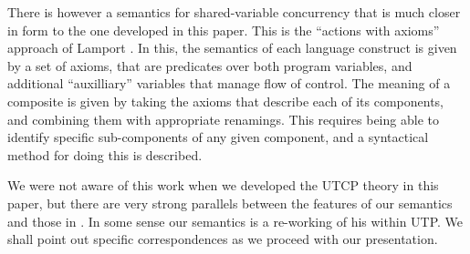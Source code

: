 There is however a semantics for shared-variable concurrency
that is much closer in form to the one developed in this paper.
This is the ``actions with axioms'' approach of Lamport \cite{Lamport1985}.
In this, the semantics of each language construct is given by a set
of axioms, that are predicates over both program variables,
and additional ``auxilliary'' variables that manage flow of control.
The meaning of a composite is given by taking the axioms that
describe each of its components, and combining them with appropriate
renamings.
This requires being able to identify specific sub-components
of any given component, and a syntactical method for doing this
is described.

We were not aware of this work when we developed the UTCP theory
in this paper,
but there are very strong parallels between the features of our
semantics and those in \cite{Lamport1985}.
In some sense our semantics is a re-working of his within UTP.
We shall point out specific correspondences as we proceed with our presentation.

